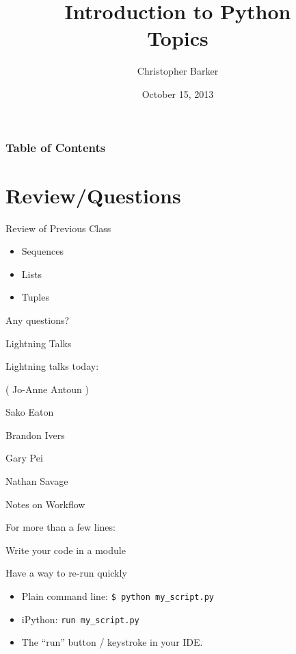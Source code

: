 \documentclass{beamer}
\title[Intro to Python: Week 1]{Introduction  to Python\\ Topics}
\author{Christopher Barker}
\institute{UW Continuing Education}
\date{October 15, 2013}
\begin{document}
\begin{frame}
  \titlepage
\end{frame}

\begin{frame}
\frametitle{Table of Contents}
  \tableofcontents
\end{frame}


\section{Review/Questions}

\begin{frame}{Review of Previous Class}

\begin{itemize}
  \item Sequences
  \item Lists
  \item Tuples
\end{itemize}

\vfill
{\Large Any questions?}

\end{frame}


\begin{frame}{Lightning Talks}

\vfill
{\LARGE Lightning talks today:}

\vfill
{\Large ( Jo-Anne Antoun )}

\vfill
{\Large
 Sako Eaton

\vfill
Brandon Ivers

\vfill
Gary Pei

\vfill
Nathan Savage

}
\vfill

\end{frame}


\begin{frame}[fragile]{Notes on Workflow}

  \vfill
  {\Large For more than a few lines:}

  \vfill
  {\large Write your code in a module}

  \vfill
  {\large Have a way to re-run quickly}
  \begin{itemize}
    \item Plain command line: \verb|$ python my_script.py|
    \item iPython: \verb|run my_script.py|
    \item The ``run'' button / keystroke in your IDE.
  \end{itemize}

  \vfill

\end{frame}
\end{document}
